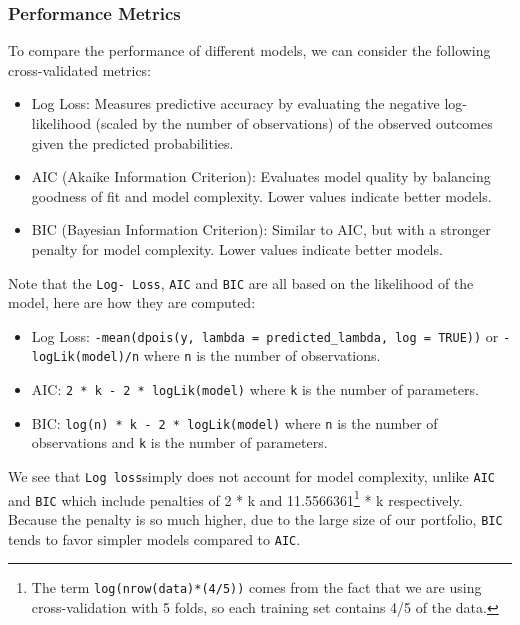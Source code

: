 \documentclass[
  english,
  11pt,
]{article}
\providecommand{\tightlist}{%
  \setlength{\itemsep}{0pt}\setlength{\parskip}{0pt}}
\begin{document}
\subsubsection{Performance Metrics}\label{performance-metrics}

To compare the performance of different models, we can consider the
following cross-validated metrics:

\begin{itemize}
\tightlist
\item
  Log Loss: Measures predictive accuracy by evaluating the negative
  log-likelihood (scaled by the number of observations) of the observed
  outcomes given the predicted probabilities.
\item
  AIC (Akaike Information Criterion): Evaluates model quality by
  balancing goodness of fit and model complexity. Lower values indicate
  better models.
\item
  BIC (Bayesian Information Criterion): Similar to AIC, but with a
  stronger penalty for model complexity. Lower values indicate better
  models.
\end{itemize}

Note that the \texttt{Log-\ Loss}, \texttt{AIC} and \texttt{BIC} are all
based on the likelihood of the model, here are how they are computed:

\begin{itemize}
\tightlist
\item
  Log Loss:
  \texttt{-mean(dpois(y,\ lambda\ =\ predicted\_lambda,\ log\ =\ TRUE))}
  or \texttt{-logLik(model)/n} where \texttt{n} is the number of
  observations.
\item
  AIC: \texttt{2\ *\ k\ -\ 2\ *\ logLik(model)} where \texttt{k} is the
  number of parameters.
\item
  BIC: \texttt{log(n)\ *\ k\ -\ 2\ *\ logLik(model)} where \texttt{n} is
  the number of observations and \texttt{k} is the number of parameters.
\end{itemize}

We see that \texttt{Log\ loss}simply does not account for model
complexity, unlike \texttt{AIC} and \texttt{BIC} which include penalties
of 2 * k and 11.5566361\footnote{The term \texttt{log(nrow(data)*(4/5))}
  comes from the fact that we are using cross-validation with 5 folds,
  so each training set contains 4/5 of the data.} * k respectively.
Because the penalty is so much higher, due to the large size of our
portfolio, \texttt{BIC} tends to favor simpler models compared to
\texttt{AIC}.
\end{document}
